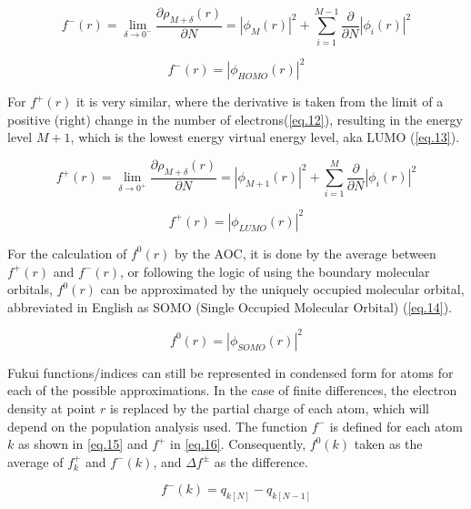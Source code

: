 \documentclass[a4paper,11pt]{refart}
\begin{document}
	\begin{equation}
	f^{-}(r) = \lim_{\delta \to 0^-} \frac{\partial \rho_{M+\delta}(r)}{\partial N} = |\phi_{M}(r)|^2  +\sum_{i=1}^{M-1} \frac{\partial}{\partial N} |\phi_i(r)|^2
	\label{eq.10}
	\end{equation}

	\begin{equation}
	f^{-}(r) = |\phi_{HOMO}(r)|^2 
	\label{eq.11}
	\end{equation}

	For $f^{+}(r)$ it is very similar, where the derivative is taken from the limit of a positive (right) change in the number of electrons(\autoref{eq.12}), resulting in the energy level $ M+1$, which is the lowest energy virtual energy level, aka LUMO (\autoref{eq.13}).

	\begin{equation}
	f^{+}(r) = \lim_{\delta \to 0^+} \frac{\partial \rho_{M+\delta}(r)}{\partial N}	 =  |\phi_{M+1}(r)|^2  + \sum_{i=1}^{M} \frac{\partial}{\partial N} |\phi_i(r)|^2
	\label{eq.12}
	\end{equation}

	\begin{equation}
	f^{+}(r) = |\phi_{LUMO}(r)|^2 
	\label{eq.13}
	\end{equation}

	For the calculation of $f^{0}(r)$ by the AOC, it is done by the average between $f^{+}(r)$ and $f^{-}(r)$, or following the logic of using the boundary molecular orbitals, $f^{0}(r)$ can be approximated by the uniquely occupied molecular orbital, abbreviated in English as SOMO (Single Occupied Molecular Orbital) (\autoref{eq.14}).

	\begin{equation}
	f^{0}(r) = |\phi_{SOMO}(r)|^2 
	\label{eq.14}
	\end{equation}

	Fukui functions/indices can still be represented in condensed form for atoms for each of the possible approximations. In the case of finite differences, the electron density at point $r$ is replaced by the partial charge of each atom, which will depend on the population analysis used. The function $f^{-}$ is defined for each atom $k$ as shown in \autoref{eq.15} and $f^{+}$ in \autoref{eq.16}. Consequently, $f^{0}(k)$ taken as the average of $f^{+}_k$ and $f^{-}(k)$, and $\Delta f^{\pm}$ as the difference.

	\begin{equation}
	f^{-}(k) = q_{k [N]} - q_{k [N-1]}
	\label{eq.15}
	\end{equation}
\end{document}
